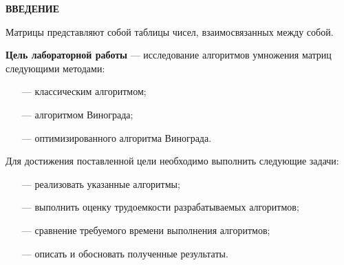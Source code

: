 \begin{center}
    \textbf{ВВЕДЕНИЕ}
\end{center}

Матрицы представляют собой таблицы чисел, взаимосвязанных между собой.

\textbf{Цель лабораторной работы} --- исследование алгоритмов умножения матриц следующими
методами:
\begin{itemize}
    \item[---] классическим алгоритмом;
    \item[---] алгоритмом Винограда;
    \item[---] оптимизированного алгоритма Винограда.
\end{itemize}

Для достижения поставленной цели необходимо выполнить следующие задачи:
\begin{itemize}
    \item[---] реализовать указанные алгоритмы;
    \item[---] выполнить оценку трудоемкости разрабатываемых алгоритмов;
    \item[---] сравнение требуемого времени выполнения алгоритмов;
    \item[---] описать и обосновать полученные результаты.
\end{itemize}
